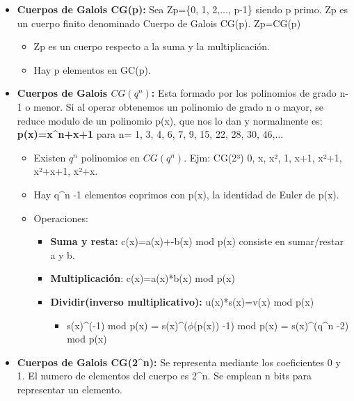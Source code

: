 \documentclass[12pt, twoside, openright]{report} %
\begin{document}
\begin{itemize}
\begin{itemize}
    \end{itemize}
  \item \textbf{Cuerpos de Galois CG(p):} Sea Zp=\{0, 1, 2,..., p-1\} siendo
    p primo. Zp es un cuerpo finito denominado Cuerpo de Galois CG(p).
    Zp=CG(p)
    

    \begin{itemize}
    \item Zp es un cuerpo respecto a la suma y la multiplicación.
      
    \item Hay p elementos en GC(p).
      
    \end{itemize}
  \item \textbf{Cuerpos de Galois $CG(q^n)$:} Esta formado por los
    polinomios de grado n-1 o menor. Si al operar obtenemos un polinomio
    de grado n o mayor, se reduce modulo de un polinomio p(x), que nos
    lo dan y normalmente es: \textbf{p(x)=x\^{}n+x+1} para n= 1, 3, 4,
    6, 7, 9, 15, 22, 28, 30, 46,...
    

    \begin{itemize}
    \item Existen $q^n$ polinomios en $CG(q^n)$. Ejm: CG(2³) 0, x, x², 1,
      x+1, x²+1, x²+x+1, x²+x.
      
    \item Hay q\^{}n -1 elementos coprimos con p(x), la identidad de Euler
      de p(x).
      
    \item Operaciones:
      

      \begin{itemize}
      \item \textbf{Suma y resta:} c(x)=a(x)+-b(x) mod p(x) consiste en
        sumar/restar a y b.
        
      \item \textbf{Multiplicación}: c(x)=a(x)*b(x) mod p(x)
        
      \item \textbf{Dividir(inverso multiplicativo):} u(x)*s(x)=v(x) mod
        p(x)
        

        \begin{itemize}
        \item s(x)\^{}(-1) mod p(x) = s(x)\^{}($\phi$(p(x)) -1) mod p(x) =
          s(x)\^{}(q\^{}n -2) mod p(x)
          
        \end{itemize}
      \end{itemize}
    \end{itemize}
  \item \textbf{Cuerpos de Galois CG(2\^{}n):} Se representa mediante los
    coeficientes 0 y 1. El numero de elementos del cuerpo es 2\^{}n. Se
    emplean n bits para representar un elemento.
    


\end{itemize}
\end{document}
